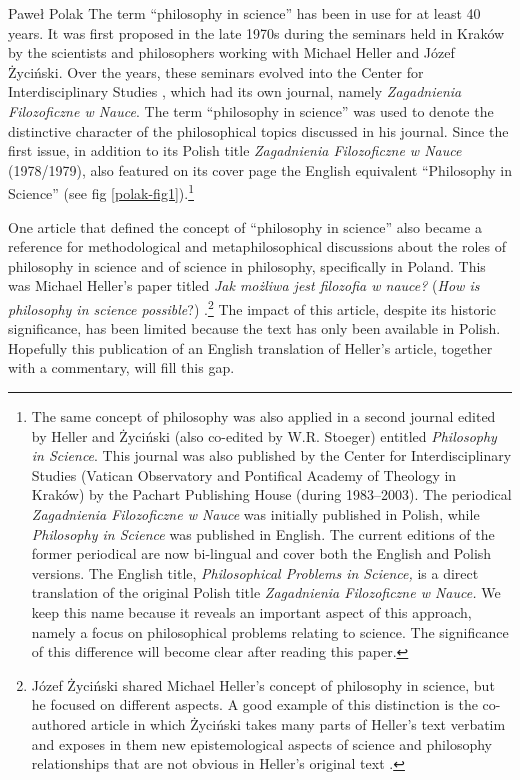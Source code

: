 \begin{artengenv}{Paweł Polak}
\lettrine[loversize=0.13,lines=2,lraise=-0.05,nindent=0em,findent=0.2pt]%
{T}{}he term ``philosophy in science'' has been in use for at least 40 years. It was first proposed in the late 1970s during
the seminars held in Kraków by the scientists and philosophers working with Michael Heller and Józef Życiński. Over the
years, these seminars evolved into the Center for Interdisciplinary Studies
\parencite{pol_trombik_origin_2019},
which had its own journal, namely \textit{Zagadnienia Filozoficzne w Nauce}. The term ``philosophy in science''
was used to denote the distinctive character of the philosophical topics discussed in his journal. Since the first
issue, in addition to its Polish title \textit{Zagadnienia Filozoficzne w Nauce} (1978/1979), also featured on its
cover page the English equivalent ``Philosophy in Science'' (see fig \ref{polak-fig1}).\footnote{The same concept of philosophy was
also applied in a second journal edited by Heller and Życiński (also co-edited by W.R. Stoeger) entitled
\textit{Philosophy in Science}. This journal was also published by the Center for Interdisciplinary Studies (Vatican
Observatory and Pontifical Academy of Theology in Kraków) by the Pachart Publishing House (during 1983–2003). The
periodical \textit{Zagadnienia Filozoficzne w Nauce} was initially published in Polish, while \textit{Philosophy in
Science }was published in English. The current editions of the former periodical are now bi-lingual and cover both the
English and Polish versions. The English title, \textit{Philosophical Problems in Science,} is a direct translation of
the original Polish title \textit{Zagadnienia Filozoficzne w Nauce. }We keep this name because it reveals an important
aspect of this approach, namely a focus on philosophical problems relating to science. The significance of this
difference will become clear after reading this paper.}



One article that defined the concept of ``philosophy in science'' also became a reference for methodological and
metaphilosophical discussions about the roles of philosophy in science and of science in philosophy, specifically in
Poland. This was Michael Heller’s paper titled \textit{Jak możliwa jest filozofia w nauce?} (\textit{How is philosophy
in science possible}?)
\parencite{pol_heller_jak_1986}.\footnote{Józef Życiński shared Michael Heller's concept
of philosophy in science, but he focused on different aspects. A good example of this distinction is the co-authored
article in which Życiński takes many parts of Heller's text verbatim and exposes in them new epistemological aspects of
science and philosophy relationships that are not obvious in Heller’s original text
\parencite{pol_heller_epistemologiczne_1987}.
} The impact of this article, despite its historic significance, has been limited because the text
has only been available in Polish. Hopefully this publication of an English translation of Heller’s article, together
with a commentary, will fill this gap.


\end{artengenv}
